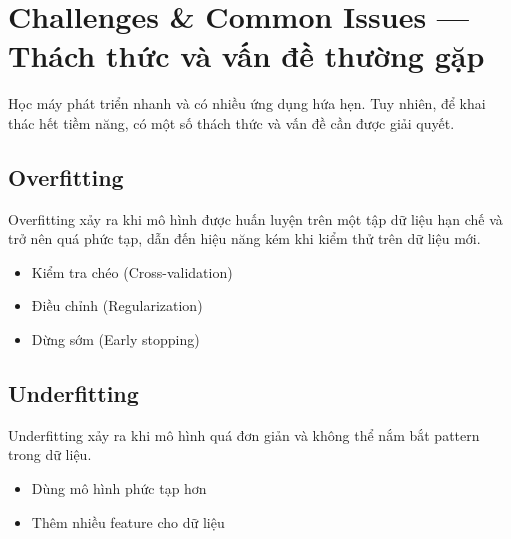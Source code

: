 \section{Challenges \& Common Issues --- Thách thức và vấn đề thường gặp}

\begin{dongco}[title={Tổng quan}]
Học máy phát triển nhanh và có nhiều ứng dụng hứa hẹn.
Tuy nhiên, để khai thác hết tiềm năng, có một số thách thức và vấn đề cần được giải quyết.
\end{dongco}

\subsection{Overfitting}

\begin{dinhnghia}[title={Overfitting}]
Overfitting xảy ra khi mô hình được huấn luyện trên một tập dữ liệu hạn chế và trở nên quá phức tạp,
dẫn đến hiệu năng kém khi kiểm thử trên dữ liệu mới.
\end{dinhnghia}

\begin{phuongphap}[title={Cách xử lý}]
\begin{itemize}
  \item Kiểm tra chéo (Cross-validation)
  \item Điều chỉnh (Regularization)
  \item Dừng sớm (Early stopping)
\end{itemize}
\end{phuongphap}

\subsection{Underfitting}

\begin{dinhnghia}[title={Underfitting}]
Underfitting xảy ra khi mô hình quá đơn giản và không thể nắm bắt pattern trong dữ liệu.
\end{dinhnghia}

\begin{phuongphap}[title={Cách xử lý}]
\begin{itemize}
  \item Dùng mô hình phức tạp hơn
  \item Thêm nhiều feature cho dữ liệu
\end{itemize}
\end{phuongphap}

